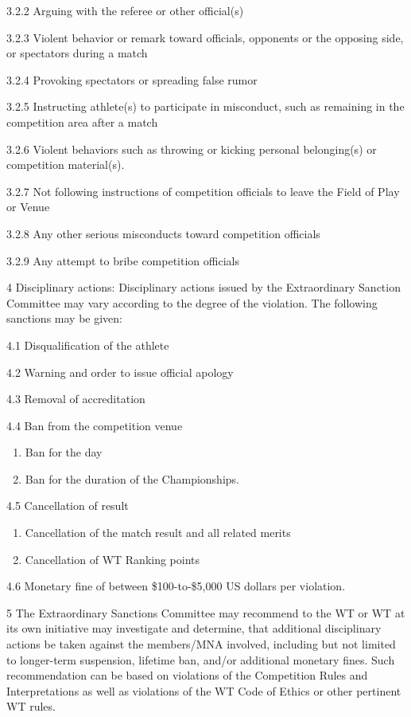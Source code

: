 \documentclass[
]{report}
\renewcommand{\labelenumi}{\arabic{enumi}}
\begin{document}
3.2.2 Arguing with the referee or other official(s)

3.2.3 Violent behavior or remark toward officials, opponents or the
opposing side, or spectators during a match

3.2.4 Provoking spectators or spreading false rumor

3.2.5 Instructing athlete(s) to participate in misconduct, such as
remaining in the competition area after a match

3.2.6 Violent behaviors such as throwing or kicking personal
belonging(s) or competition material(s).

3.2.7 Not following instructions of competition officials to leave the
Field of Play or Venue

3.2.8 Any other serious misconducts toward competition officials

3.2.9 Any attempt to bribe competition officials

4 Disciplinary actions: Disciplinary actions issued by the Extraordinary
Sanction Committee may vary according to the degree of the violation.
The following sanctions may be given:

4.1 Disqualification of the athlete

4.2 Warning and order to issue official apology

4.3 Removal of accreditation

4.4 Ban from the competition venue

\begin{enumerate}
\def\labelenumi{\roman{enumi})}
\item
  Ban for the day
\item
  Ban for the duration of the Championships.
\end{enumerate}

4.5 Cancellation of result

\begin{enumerate}
\def\labelenumi{\roman{enumi})}
\item
  Cancellation of the match result and all related merits
\item
  Cancellation of WT Ranking points
\end{enumerate}

4.6 Monetary fine of between \$100-to-\$5,000 US dollars per violation.

5 The Extraordinary Sanctions Committee may recommend to the WT or WT at
its own initiative may investigate and determine, that additional
disciplinary actions be taken against the members/MNA involved,
including but not limited to longer-term suspension, lifetime ban,
and/or additional monetary fines. Such recommendation can be based on
violations of the Competition Rules and Interpretations as well as
violations of the WT Code of Ethics or other pertinent WT rules.
\end{document}
